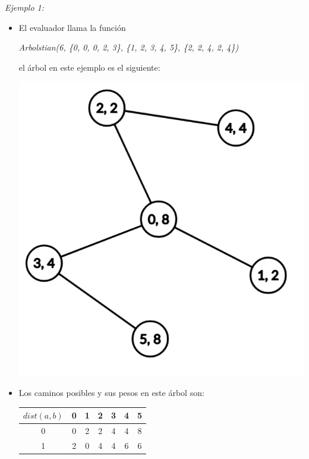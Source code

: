 \documentclass[12pt]{scrartcl}
\begin{document}
        {\itshape Ejemplo 1:}
        \begin{itemize}
            \item El evaluador llama la función 
            \begin{center}
                \textit{Arbolstian(6, \{0, 0, 0, 2, 3\}, \{1, 2, 3, 4, 5\}, \{2, 2, 4, 2, 4\})}
            \end{center}
            el árbol en este ejemplo es el siguiente:
            
            \begin{center}
                \includegraphics[scale=0.2]{ej1.png}
            \end{center}
            \item Los caminos posibles y sus pesos en este árbol son:
            \begin{center}
                \begin{tabular}{|c||c|c|c|c|c|c|}
                    \hline
                     $dist(a, b)$ & 0 & 1 & 2 & 3 & 4 & 5 \\
                     \hline
                     \hline
                     0 & 0 & 2 & 2 & 4 & 4 & 8 \\
                     \hline
                     1 & 2 & 0 & 4 & 4 & 6 & 6 \\

\end{tabular}
\end{center}
\end{itemize}
\end{document}
